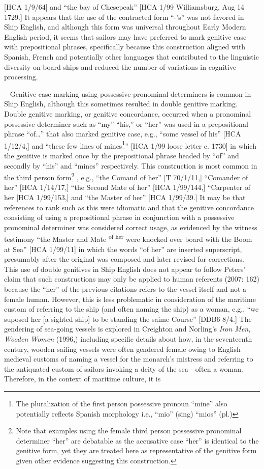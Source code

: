 [HCA 1/9/64] and “the bay of Chesepeak” [HCA 1/99 Williamsburg, Aug 14 1729.] It appears that the use of the contracted form “-’s” was not favored in Ship English, and although this form was universal throughout Early Modern English period, it seems that sailors may have preferred to mark genitive case with prepositional phrases, specifically because this construction aligned with Spanish, French and potentially other languages that contributed to the linguistic diversity on board ships and reduced the number of variations in cognitive processing.

~  Genitive case marking using possessive pronominal determiners is common in Ship English, although this sometimes resulted in double genitive marking. Double genitive marking, or genitive concordance, occurred when a pronominal possessive determiner such as “my” “his,” or “her” was used in a prepositional phrase “of…” that also marked genitive case, e.g., “some vessel of his” [HCA 1/12/4,] and “these few lines of mines\footnote{The pluralization of the first person possessive pronoun “mine” also potentially reflects Spanish morphology i.e., “mio” (sing) “mios” (pl.)}” [HCA 1/99 loose letter c. 1730] in which the genitive is marked once by the prepositional phrase headed by “of” and secondly by “his” and “mines” respectively. This construction is most common in the third person form\footnote{Note that examples using the female third person possessive pronominal determiner “her” are debatable as the accusative case “her” is identical to the genitive form, yet they are treated here as representative of the genitive form given other evidence suggesting this construction.} , e.g., “the Comand of her” [T 70/1/11,] “Comander of her” [HCA 1/14/17,] “the Second Mate of her” [HCA 1/99/144,] “Carpenter of her [HCA 1/99/153,] and “the Master of her” [HCA 1/99/39.] It may be that references to rank such as this were idiomatic and that the genitive concordance consisting of using a prepositional phrase in conjunction with a possessive pronominal determiner was considered correct usage, as evidenced by the witness testimony “the Master and Mate \textsuperscript{of her} were knocked over board with the Boom at Sea” [HCA 1/99/11] in which the words “of her” are inserted superscript, presumably after the original was composed and later revised for corrections.  This use of double genitives in Ship English does not appear to follow Peters’ claim that such constructions may only be applied to human referents (2007: 162) because the “her” of the previous citations refers to the vessel itself and not a female human. However, this is less problematic in consideration of the maritime custom of referring to the ship (and often naming the ship) as a woman, e.g., “we suposed her [a sighted ship] to be standing the saime Course” [DDB6 8/4.] The gendering of sea-going vessels is explored in Creighton and Norling’s \textit{Iron Men, Wooden Women} (1996,) including specific details about how, in the seventeenth century, wooden sailing vessels were often gendered female owing to English medieval customs of naming a vessel for the monarch’s mistress and referring to the antiquated custom of sailors invoking a deity of the sea - often a woman. Therefore, in the context of maritime culture, it is 
